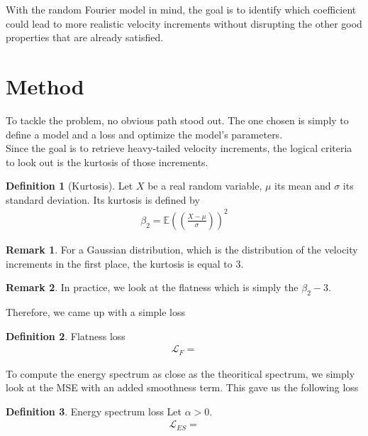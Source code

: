 \documentclass[a4paper,12pt]{article}
\theoremstyle{definition}
\newtheorem{definition}{Definition}
\newtheorem{remark}{Remark}
\begin{document}
\bigskip
With the random Fourier model in mind, the goal is to identify which coefficient could lead to more realistic velocity increments without disrupting the other good properties that are already satisfied. 


\section{Method}
To tackle the problem, no obvious path stood out. 
The one chosen is simply to define a model and a loss and optimize the model's parameters. \\
Since the goal is to retrieve heavy-tailed velocity increments, the logical criteria to look out is the kurtosis of those increments. 


\begin{definition}[Kurtosis]
    Let $X$ be a real random variable, $\mu$ its mean and $\sigma$ its standard deviation. Its kurtosis is defined by 
    \begin{align}
    \beta_2=\mathbb{E}\left((\frac{X-\mu}{\sigma}) \right)^2    
    \end{align}
     
\end{definition}

\begin{remark}
    For a Gaussian distribution, which is the distribution of the velocity increments in the first place, the kurtosis is equal to 3.
\end{remark}

\begin{remark}
    In practice, we look at the flatness which is simply the $\beta_2-3$.
\end{remark}
Therefore, we came up with a simple loss 

\begin{definition}{Flatness loss}
    \begin{align}
        \mathcal{L}_F = 
    \end{align}
\end{definition}

To compute the energy spectrum as close as the theoritical spectrum, we simply look at the MSE with an added smoothness term. This gave us the following loss

\begin{definition} Energy spectrum loss
    Let $\alpha>0$. 
    \begin{align}
        \mathcal{L}_{ES} = 
    \end{align} 
\end{definition}
\end{document}
